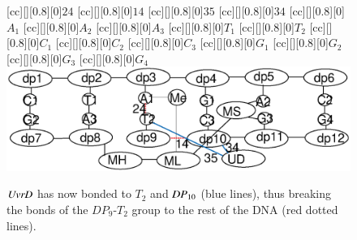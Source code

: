 \begin{figure}[h!]
[cc][][0.8][0]{$24$}
[cc][][0.8][0]{$14$}
[cc][][0.8][0]{$35$}
[cc][][0.8][0]{$34$}
[cc][][0.8][0]{${A_1}$}
[cc][][0.8][0]{${A_2}$}
[cc][][0.8][0]{${A_3}$}
[cc][][0.8][0]{${T_1}$}
[cc][][0.8][0]{${T_2}$}
[cc][][0.8][0]{${C_1}$}
[cc][][0.8][0]{${C_2}$}
[cc][][0.8][0]{${C_3}$}
[cc][][0.8][0]{${G_1}$}
[cc][][0.8][0]{${G_2}$}
[cc][][0.8][0]{${G_3}$}
[cc][][0.8][0]{${G_4}$}
  \centering
    \includegraphics[width=1.0\textwidth]{mmr/state3}
  \caption[A six base pair DNA fragment.]{%
  $\mathit{UvrD}$ has now bonded to $T_2$ and $\mathit{DP}_{10}$ (blue lines), thus breaking the bonds of  the $DP_9$-$T_2$ group to the rest of the DNA (red dotted lines). %
}
  \label{fig:state3}
\end{figure}

